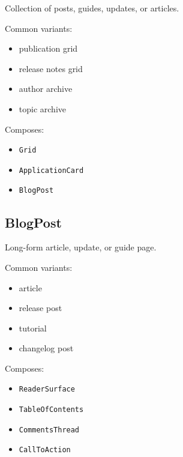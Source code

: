 Collection of posts, guides, updates, or articles.

Common variants:

\begin{itemize}
\tightlist
\item
  publication grid
\item
  release notes grid
\item
  author archive
\item
  topic archive
\end{itemize}

Composes:

\begin{itemize}
\tightlist
\item
  \texttt{G\allowbreak{}r\allowbreak{}i\allowbreak{}d}
\item
  \texttt{A\allowbreak{}p\allowbreak{}p\allowbreak{}l\allowbreak{}i\allowbreak{}c\allowbreak{}a\allowbreak{}t\allowbreak{}i\allowbreak{}o\allowbreak{}n\allowbreak{}C\allowbreak{}a\allowbreak{}r\allowbreak{}d}
\item
  \texttt{B\allowbreak{}l\allowbreak{}o\allowbreak{}g\allowbreak{}P\allowbreak{}o\allowbreak{}s\allowbreak{}t}
\end{itemize}

\subsection{BlogPost}\label{record-128-blogpost}

Long-form article, update, or guide page.

Common variants:

\begin{itemize}
\tightlist
\item
  article
\item
  release post
\item
  tutorial
\item
  changelog post
\end{itemize}

Composes:

\begin{itemize}
\tightlist
\item
  \texttt{R\allowbreak{}e\allowbreak{}a\allowbreak{}d\allowbreak{}e\allowbreak{}r\allowbreak{}S\allowbreak{}u\allowbreak{}r\allowbreak{}f\allowbreak{}a\allowbreak{}c\allowbreak{}e}
\item
  \texttt{T\allowbreak{}a\allowbreak{}b\allowbreak{}l\allowbreak{}e\allowbreak{}O\allowbreak{}f\allowbreak{}C\allowbreak{}o\allowbreak{}n\allowbreak{}t\allowbreak{}e\allowbreak{}n\allowbreak{}t\allowbreak{}s}
\item
  \texttt{C\allowbreak{}o\allowbreak{}m\allowbreak{}m\allowbreak{}e\allowbreak{}n\allowbreak{}t\allowbreak{}s\allowbreak{}T\allowbreak{}h\allowbreak{}r\allowbreak{}e\allowbreak{}a\allowbreak{}d}
\item
  \texttt{C\allowbreak{}a\allowbreak{}l\allowbreak{}l\allowbreak{}T\allowbreak{}o\allowbreak{}A\allowbreak{}c\allowbreak{}t\allowbreak{}i\allowbreak{}o\allowbreak{}n}
\end{itemize}


